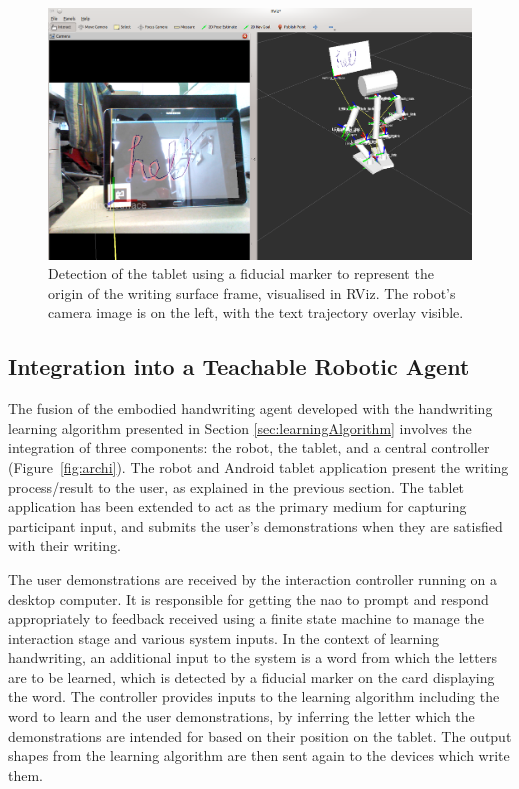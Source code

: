 \documentclass{sig-alternate}
\begin{document}
\begin{figure}[htpb]
    \centering
    \includegraphics[width=0.9\columnwidth]{figures/chilitagDetection_cameraOverlay.png}
    \caption{\label{fig:tabletDetection}Detection of the tablet using a fiducial
    marker to represent the origin of the writing surface frame, visualised in RViz. The robot's
    camera image is on the left, with the text trajectory overlay visible.}

\end{figure}


\subsection{Integration into a Teachable Robotic Agent}

The fusion of the embodied handwriting agent developed with the handwriting
learning algorithm presented in Section \ref{sec:learningAlgorithm} involves the
integration of three components: the robot, the tablet, and a central controller
(Figure~\ref{fig:archi}). The robot and Android tablet application present the
writing process/result to the user, as explained in the previous section.
The tablet application has been extended to act as the primary medium for
capturing participant input, and submits the user's demonstrations when they are
satisfied with their writing. 

The user demonstrations are received by the interaction controller running on a
desktop computer. It is responsible for getting the {\sc nao} to prompt and
respond appropriately to feedback received using a finite state machine to
manage the interaction stage and various system inputs. In the context of
learning handwriting, an additional input to the system is a word from which the
letters are to be learned, which is detected by a fiducial marker on the card
displaying the word.  The controller provides inputs to the learning algorithm
including the word to learn and the user demonstrations, by inferring the letter
which the demonstrations are intended for based on their position on the tablet.
The output shapes from the learning algorithm are then sent again to the devices
which write them.
\end{document}

